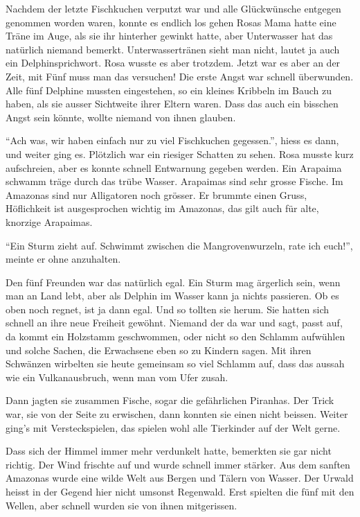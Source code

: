 Nachdem der letzte Fischkuchen verputzt war und alle Glückwünsche entgegen genommen worden waren, konnte es endlich los gehen Rosas Mama hatte eine Träne im Auge, als sie ihr hinterher gewinkt hatte, aber Unterwasser hat das natürlich niemand bemerkt. Unterwassertränen sieht man nicht, lautet ja auch ein Delphinsprichwort. Rosa wusste es aber trotzdem. Jetzt war es aber an der Zeit, mit Fünf muss man das versuchen! Die erste Angst war schnell überwunden. Alle fünf Delphine mussten eingestehen, so ein kleines Kribbeln im Bauch zu haben, als sie ausser Sichtweite ihrer Eltern waren. Dass das auch ein bisschen Angst sein könnte, wollte niemand von ihnen glauben.

\enquote{Ach was, wir haben einfach nur zu viel Fischkuchen gegessen.}, hiess es dann, und weiter ging es. Plötzlich war ein riesiger Schatten zu sehen. Rosa musste kurz aufschreien, aber es konnte schnell Entwarnung gegeben werden. Ein Arapaima schwamm träge durch das trübe Wasser. Arapaimas sind sehr grosse Fische. Im Amazonas sind nur Alligatoren noch grösser. Er brummte einen Gruss, Höflichkeit ist ausgesprochen wichtig im Amazonas, das gilt auch für alte, knorzige Arapaimas.

\enquote{Ein Sturm zieht auf. Schwimmt zwischen die Mangrovenwurzeln, rate ich euch!}, meinte er ohne anzuhalten. 

Den fünf Freunden war das natürlich egal. Ein Sturm mag ärgerlich sein, wenn man an Land lebt, aber als Delphin im Wasser kann ja nichts passieren. Ob es oben noch regnet, ist ja dann egal. Und so tollten sie herum. Sie hatten sich schnell an ihre neue Freiheit gewöhnt. Niemand der da war und sagt, passt auf, da kommt ein Holzstamm geschwommen, oder nicht so den Schlamm aufwühlen und solche Sachen, die Erwachsene eben so zu Kindern sagen. Mit ihren Schwänzen wirbelten sie heute gemeinsam so viel Schlamm auf, dass das aussah wie ein Vulkanausbruch, wenn man vom Ufer zusah.

Dann jagten sie zusammen Fische, sogar die gefährlichen Piranhas. Der Trick war, sie von der Seite zu erwischen, dann konnten sie einen nicht beissen. Weiter ging's mit Versteckspielen, das spielen wohl alle Tierkinder auf der Welt gerne.

Dass sich der Himmel immer mehr verdunkelt hatte, bemerkten sie gar nicht richtig. Der Wind frischte auf und wurde schnell immer stärker. Aus dem sanften Amazonas wurde eine wilde Welt aus Bergen und Tälern von Wasser. Der Urwald heisst in der Gegend hier nicht umsonst Regenwald. Erst spielten die fünf mit den Wellen, aber schnell wurden sie von ihnen mitgerissen.

